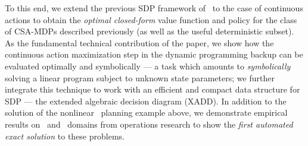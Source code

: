 To this end, we extend the previous SDP framework
of~\cite{sanner_uai11} to the case of continuous actions to obtain the
\emph{optimal closed-form} value function and policy for the
class of CSA-MDPs described previously (as well as the useful
deterministic subset).
As the fundamental technical contribution of the paper, we
show how the continuous action maximization step in the dynamic programming
backup can be evaluated optimally and symbolically --- a task which
amounts to \emph{symbolically} solving a linear program subject to
unknown state parameters; we further integrate this technique to work
with an efficient and compact data structure for SDP --- the extended
algebraic decision diagram (XADD).  
In addition to the solution of the nonlinear \MarsRover\
planning example above, we demonstrate empirical results on
\WaterReservoir\ and \InventoryControl\ domains from operations research
to show the \emph{first automated exact solution} to these problems.
